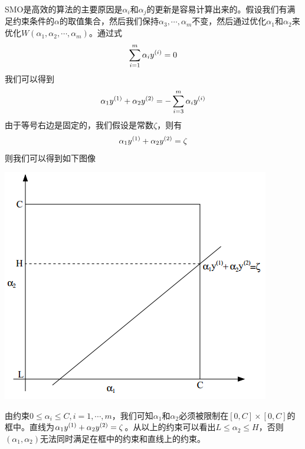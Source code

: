 SMO是高效的算法的主要原因是$\alpha_i$和$\alpha_j$的更新是容易计算出来的。假设我们有满足约束条件的$\alpha$的取值集合，然后我们保持$\alpha_3,\cdots,\alpha_m$不变，然后通过优化$\alpha_1$和$\alpha_2$来优化$W(\alpha_1,\alpha_2,\cdots,\alpha_m)$。通过式
\begin{eqnarray}
\sum_{i=1}^m\alpha_i{y}^{({i})}=0
\end{eqnarray}
我们可以得到
\begin{eqnarray}
\alpha_1{y}^{({1})}+\alpha_2{y}^{({2})}=-\sum_{i=3}^m\alpha_i{y}^{({i})}
\end{eqnarray}
由于等号右边是固定的，我们假设是常数$\zeta$，则有
\begin{eqnarray}
\alpha_1{y}^{({1})}+\alpha_2{y}^{({2})}=\zeta
\end{eqnarray}
则我们可以得到如下图像
\begin{center}
\includegraphics[scale=1]{../figures/SVM7.PNG} 
\end{center}
由约束$0\leq\alpha_i\leq C,i=1,\cdots,m$，我们可知$\alpha_1$和$\alpha_2$必须被限制在$[0,C]\times[0,C]$的框中。直线为$\alpha_1{y}^{({1})}+\alpha_2{y}^{({2})}=\zeta$。从以上的约束可以看出$L\leq\alpha_2\leq H$，否则$(\alpha_1,\alpha_2)$无法同时满足在框中的约束和直线上的约束。

